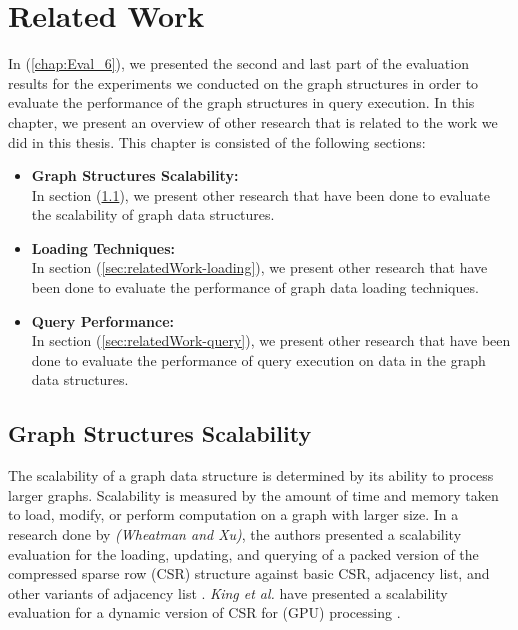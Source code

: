 {\chapter{Related Work}
\label{chap:RelatedWork}


In (\ref{chap:Eval_6}), we presented the second and last part of the evaluation results for the experiments we conducted on the graph structures in order to evaluate the performance of the graph structures in query execution. In this chapter, we present an overview of other research that is related to the work we did in this thesis. This chapter is consisted of the following sections:

\begin{itemize}  

\item \textbf{Graph Structures Scalability:}\\
In section (\ref{sec:relatedWork-scalability}), we present other research that have been done to evaluate the scalability of graph data structures.

\item \textbf{Loading Techniques:}\\
In section (\ref{sec:relatedWork-loading}), we present other research that have been done to evaluate the performance of graph data loading techniques.

\item \textbf{Query Performance:}\\
In section (\ref{sec:relatedWork-query}), we present other research that have been done to evaluate the performance of query execution on data in the graph data structures.

\end{itemize}


\section{Graph Structures Scalability}
\label{sec:relatedWork-scalability}

The scalability of a graph data structure is determined by its ability to process larger graphs. Scalability is measured by the amount of time and memory taken to load, modify, or perform computation on a graph with larger size. In a research done by \textit{(Wheatman and Xu)}, the authors presented a scalability evaluation for the loading, updating, and querying of a packed version of the compressed sparse row (CSR) structure against basic CSR, adjacency list, and other variants of adjacency list \cite{wheatmanpacked}. \textit{King et al.} have presented a scalability evaluation for a dynamic version of CSR for (GPU) processing \cite{King2016DynamicCSRA}.

}
